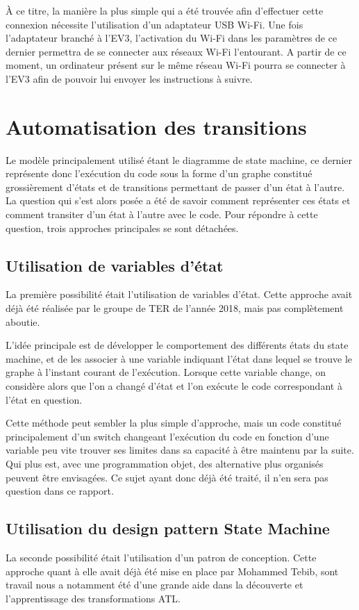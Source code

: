 \documentclass[french, 12pt, a4paper]{article}
\begin{document}
    À ce titre, la manière la plus simple qui a été trouvée afin d'effectuer cette connexion nécessite l'utilisation d'un adaptateur USB Wi-Fi. Une fois l'adaptateur branché à l'EV3, l'activation du Wi-Fi dans les paramètres de ce dernier permettra de se connecter aux réseaux Wi-Fi l'entourant. A partir de ce moment, un ordinateur présent sur le même réseau Wi-Fi pourra se connecter à l'EV3 afin de pouvoir lui envoyer les instructions à suivre.


\section{Automatisation des transitions}
    Le modèle principalement utilisé étant le diagramme de state machine, ce dernier représente donc l'exécution du code sous la forme d'un graphe constitué grossièrement d'états et de transitions permettant de passer d'un état à l'autre. La question qui s'est alors posée a été de savoir comment représenter ces états et comment transiter d'un état à l'autre avec le code. Pour répondre à cette question, trois approches principales se sont détachées.
    
    \subsection{Utilisation de variables d'état}
    La première possibilité était l'utilisation de variables d'état. Cette approche avait déjà été réalisée par le groupe de TER de l'année 2018, mais pas complètement aboutie.
    
    L'idée principale est de développer le comportement des différents états du state machine, et de les associer à une variable indiquant l'état dans lequel se trouve le graphe à l'instant courant de l'exécution. Lorsque cette variable change, on considère alors que l'on a changé d'état et l'on exécute le code correspondant à l'état en question.
    
    Cette méthode peut sembler la plus simple d'approche, mais un code constitué principalement d'un switch changeant l'exécution du code en fonction d'une variable peu vite trouver ses limites dans sa capacité à être maintenu par la suite. Qui plus est, avec une programmation objet, des alternative plus organisés peuvent être envisagées. Ce sujet ayant donc déjà été traité, il n'en sera pas question dans ce rapport.
    
    \subsection{Utilisation du design pattern State Machine}
    La seconde possibilité était l'utilisation d'un patron de conception. Cette approche quant à elle avait déjà été mise en place par Mohammed Tebib, sont travail nous a notamment été d'une grande aide dans la découverte et l'apprentissage des transformations ATL.
    
\end{document}
